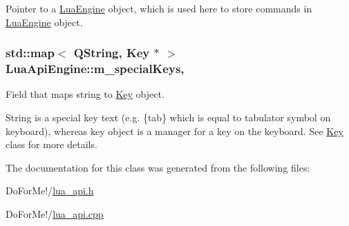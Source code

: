Pointer to a \hyperlink{class_lua_engine}{Lua\-Engine} object, which is used here to store commands in \hyperlink{class_lua_engine}{Lua\-Engine} object. 

\hypertarget{class_lua_api_engine_a9fdba2d7f2f8d051453b5d1561435f5e}{
\subsubsection[{m\-\_\-special\-Keys}]{\setlength{\rightskip}{0pt plus 5cm}std\-::map$<$ Q\-String, {\bf Key} $\ast$ $>$ Lua\-Api\-Engine\-::m\-\_\-special\-Keys\hspace{0.3cm}{\ttfamily [static]}, {\ttfamily [private]}}}\label{class_lua_api_engine_a9fdba2d7f2f8d051453b5d1561435f5e}


Field that maps string to \hyperlink{class_key}{Key} object. 

String is a special key text (e.\-g. \{tab\} which is equal to tabulator symbol on keyboard), whereas key object is a manager for a key on the keyboard. See \hyperlink{class_key}{Key} class for more details. 

The documentation for this class was generated from the following files\-:\begin{DoxyCompactItemize}
\item 
Do\-For\-Me!/\hyperlink{lua__api_8h}{lua\-\_\-api.\-h}\item 
Do\-For\-Me!/\hyperlink{lua__api_8cpp}{lua\-\_\-api.\-cpp}\end{DoxyCompactItemize}
